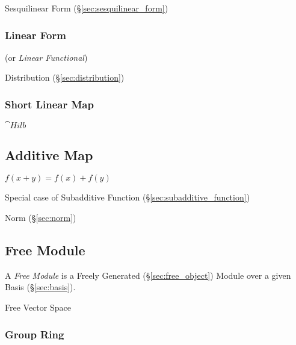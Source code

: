 Sesquilinear Form (\S\ref{sec:sesquilinear_form})



\subsubsection{Linear Form}\label{sec:linear_form}

(or \emph{Linear Functional})

Distribution (\S\ref{sec:distribution})



\subsubsection{Short Linear Map}\label{sec:short_linear}

$\cat{Hilb}$



\subsection{Additive Map}\label{sec:additive_map}

$f(x + y) = f(x) + f(y)$

Special case of Subadditive Function (\S\ref{sec:subadditive_function})

Norm (\S\ref{sec:norm})



\subsection{Free Module}\label{sec:free_module}

A \emph{Free Module} is a Freely Generated (\S\ref{sec:free_object})
Module over a given Basis (\S\ref{sec:basis}).

Free Vector Space



\subsubsection{Group Ring}\label{sec:group_ring}



